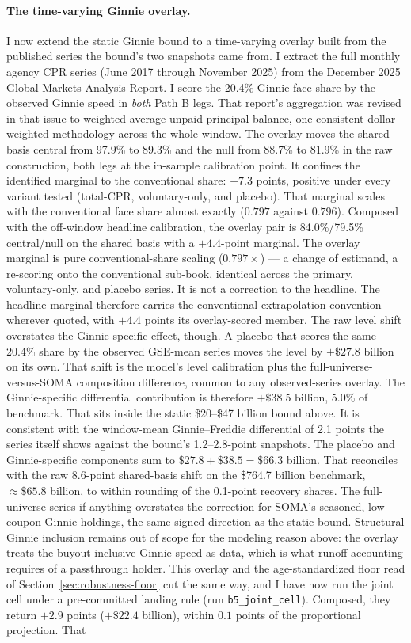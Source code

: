 \documentclass[12pt]{article}
\begin{document}
\paragraph{The time-varying Ginnie overlay.}
I now extend the static Ginnie bound to a time-varying overlay built from the published series the bound's two snapshots came from. I extract the full monthly agency CPR series (June 2017 through November 2025) from the December 2025 Global Markets Analysis Report. I score the 20.4\% Ginnie face share by the observed Ginnie speed in \emph{both} Path B legs. That report's aggregation was revised in that issue to weighted-average unpaid principal balance, one consistent dollar-weighted methodology across the whole window. The overlay moves the shared-basis central from 97.9\% to 89.3\% and the null from 88.7\% to 81.9\% in the raw construction, both legs at the in-sample calibration point. It confines the identified marginal to the conventional share: $+7.3$ points, positive under every variant tested (total-CPR, voluntary-only, and placebo). That marginal scales with the conventional face share almost exactly ($0.797$ against $0.796$). Composed with the off-window headline calibration, the overlay pair is 84.0\%/79.5\% central/null on the shared basis with a $+4.4$-point marginal. The overlay marginal is pure conventional-share scaling ($0.797\times$) --- a change of estimand, a re-scoring onto the conventional sub-book, identical across the primary, voluntary-only, and placebo series. It is not a correction to the headline. The headline marginal therefore carries the conventional-extrapolation convention wherever quoted, with $+4.4$ points its overlay-scored member. The raw level shift overstates the Ginnie-specific effect, though. A placebo that scores the same 20.4\% share by the observed GSE-mean series moves the level by $+\$27.8$ billion on its own. That shift is the model's level calibration plus the full-universe-versus-SOMA composition difference, common to any observed-series overlay. The Ginnie-specific differential contribution is therefore $+\$38.5$ billion, 5.0\% of benchmark. That sits inside the static \$20--\$47 billion bound above. It is consistent with the window-mean Ginnie--Freddie differential of 2.1 points the series itself shows against the bound's 1.2--2.8-point snapshots. The placebo and Ginnie-specific components sum to $\$27.8 + \$38.5 = \$66.3$ billion. That reconciles with the raw 8.6-point shared-basis shift on the \$764.7 billion benchmark, $\approx\$65.8$ billion, to within rounding of the 0.1-point recovery shares. The full-universe series if anything overstates the correction for SOMA's seasoned, low-coupon Ginnie holdings, the same signed direction as the static bound. Structural Ginnie inclusion remains out of scope for the modeling reason above: the overlay treats the buyout-inclusive Ginnie speed as data, which is what runoff accounting requires of a passthrough holder. This overlay and the age-standardized floor read of Section~\ref{sec:robustness-floor} cut the same way, and I have now run the joint cell under a pre-committed landing rule (run \texttt{b5\_joint\_cell}). Composed, they return $+2.9$ points ($+\$22.4$ billion), within $0.1$ points of the proportional projection. That 
\end{document}
